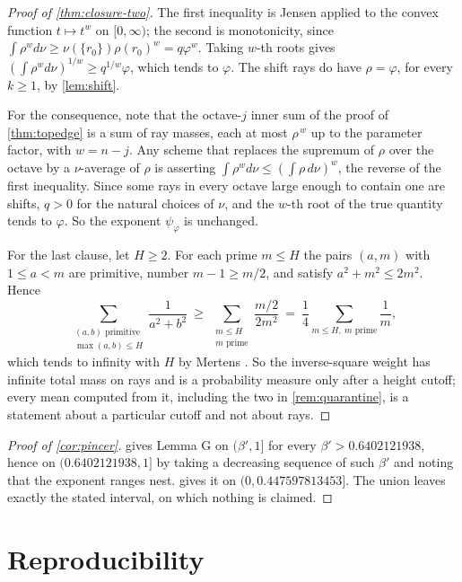 \documentclass[11pt]{amsart}
\theoremstyle{definition}
\theoremstyle{remark}
\begin{document}
\begin{proof}[Proof of \cref{thm:closure-two}]
The first inequality is Jensen applied to the convex function $t \mapsto t^w$ on $[0,\infty)$; the second is monotonicity, since $\int \rho^w d\nu \ge \nu(\{r_0\})\rho(r_0)^w = q\varphi^w$. Taking $w$-th roots gives $(\int\rho^w d\nu)^{1/w} \ge q^{1/w}\varphi$, which tends to $\varphi$. The shift rays do have $\rho = \varphi$, for every $k \ge 1$, by \cref{lem:shift}.

For the consequence, note that the octave-$j$ inner sum of the proof of \cref{thm:topedge} is a sum of ray masses, each at most $\rho^{\,w}$ up to the parameter factor, with $w = n-j$. Any scheme that replaces the supremum of $\rho$ over the octave by a $\nu$-average of $\rho$ is asserting $\int \rho^w d\nu \le (\int \rho\, d\nu)^w$, the reverse of the first inequality. Since some rays in every octave large enough to contain one are shifts, $q > 0$ for the natural choices of $\nu$, and the $w$-th root of the true quantity tends to $\varphi$. So the exponent $\psi_\varphi$ is unchanged.

For the last clause, let $H \ge 2$. For each prime $m \le H$ the pairs $(a,m)$ with $1 \le a < m$ are primitive, number $m - 1 \ge m/2$, and satisfy $a^2 + m^2 \le 2m^2$. Hence
\[
  \sum_{\substack{(a,b) \text{ primitive} \\ \max(a,b) \le H}} \frac{1}{a^2+b^2} \ \ge \ \sum_{\substack{m \le H \\ m \text{ prime}}} \frac{m/2}{2m^2} \ = \ \frac14 \sum_{m \le H,\ m \text{ prime}} \frac1m ,
\]
which tends to infinity with $H$ by Mertens \cite{mertens}. So the inverse-square weight has infinite total mass on rays and is a probability measure only after a height cutoff; every mean computed from it, including the two in \cref{rem:quarantine}, is a statement about a particular cutoff and not about rays.
\end{proof}

\begin{proof}[Proof of \cref{cor:pincer}]
 gives Lemma G on $(\beta',1]$ for every $\beta' > 0.6402121938$, hence on $(0.6402121938, 1]$ by taking a decreasing sequence of such $\beta'$ and noting that the exponent ranges nest.  gives it on $(0, 0.447597813453]$. The union leaves exactly the stated interval, on which nothing is claimed.
\end{proof}

\section{Reproducibility}
\label{sec:repro}
\end{document}
